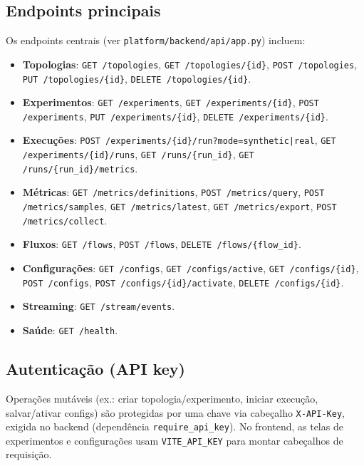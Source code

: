 \documentclass[12pt,oneside]{report}
\begin{document}
\subsection{Endpoints principais}
Os endpoints centrais (ver \texttt{platform/backend/api/app.py}) incluem:

\begin{itemize}
\item \textbf{Topologias}: \texttt{GET /topologies}, \texttt{GET /topologies/\{id\}}, \texttt{POST /topologies}, \texttt{PUT /topologies/\{id\}}, \texttt{DELETE /topologies/\{id\}}.
\item \textbf{Experimentos}: \texttt{GET /experiments}, \texttt{GET /experiments/\{id\}}, \texttt{POST /experiments}, \texttt{PUT /experiments/\{id\}}, \texttt{DELETE /experiments/\{id\}}.
\item \textbf{Execu\c{c}\~oes}: \texttt{POST /experiments/\{id\}/run?mode=synthetic|real}, \texttt{GET /experiments/\{id\}/runs}, \texttt{GET /runs/\{run\_id\}}, \texttt{GET /runs/\{run\_id\}/metrics}.
\item \textbf{M\'etricas}: \texttt{GET /metrics/definitions}, \texttt{POST /metrics/query}, \texttt{POST /metrics/samples}, \texttt{GET /metrics/latest}, \texttt{GET /metrics/export}, \texttt{POST /metrics/collect}.
\item \textbf{Fluxos}: \texttt{GET /flows}, \texttt{POST /flows}, \texttt{DELETE /flows/\{flow\_id\}}.
\item \textbf{Configura\c{c}\~oes}: \texttt{GET /configs}, \texttt{GET /configs/active}, \texttt{GET /configs/\{id\}}, \texttt{POST /configs}, \texttt{POST /configs/\{id\}/activate}, \texttt{DELETE /configs/\{id\}}.
\item \textbf{Streaming}: \texttt{GET /stream/events}.
\item \textbf{Sa\'ude}: \texttt{GET /health}.
\end{itemize}

\subsection{Autentica\c{c}\~ao (API key)}
Opera\c{c}\~oes mut\'aveis (ex.: criar topologia/experimento, iniciar execu\c{c}\~ao, salvar/ativar configs) s\~ao protegidas por uma chave via cabe\c{c}alho \texttt{X-API-Key}, exigida no backend (depend\^encia \texttt{require\_api\_key}). No frontend, as telas de experimentos e configura\c{c}\~oes usam \texttt{VITE\_API\_KEY} para montar cabe\c{c}alhos de requisi\c{c}\~ao.
\end{document}
